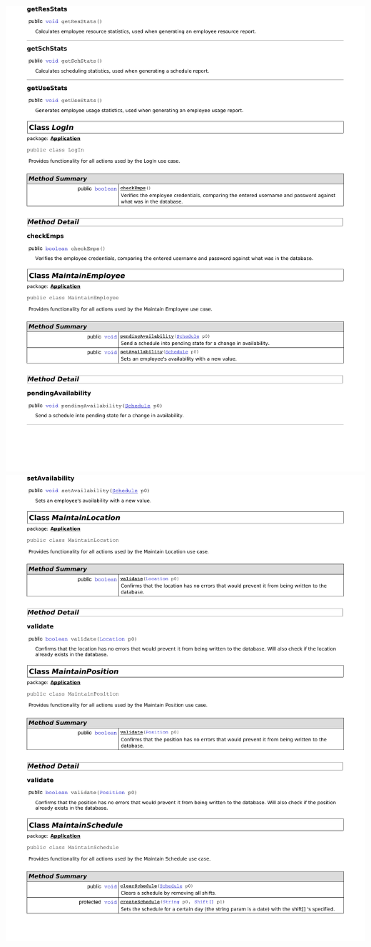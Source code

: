 \documentclass[letterpaper,12pt]{report}
\begin{document}
\includegraphics[scale=0.9,trim=20mm 30mm 25mm 0mm]{externals/dd2.pdf}
\newpage
\includegraphics[scale=0.9,trim=20mm 40mm 25mm 9mm]{externals/dd3.pdf}
\end{document}
